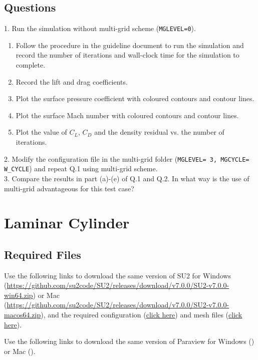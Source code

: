 \section{Questions}
1. Run the simulation without multi-grid scheme (\texttt{MGLEVEL=0}).
\begin{enumerate}[label=(\alph*)]
    \item Follow the procedure in the guideline document to run the simulation and record the number of iterations and wall-clock time for the simulation to complete.
    \item Record the lift and drag coefficients.
    \item Plot the surface pressure coefficient with coloured contours and contour lines.
    \item Plot the surface Mach number with coloured contours and contour lines.
    \item Plot the value of $C_L$, $C_D$ and the density residual vs. the number of iterations.
\end{enumerate}
2. Modify the configuration file in the multi-grid folder (\texttt{MGLEVEL= 3, MGCYCLE= W\_CYCLE}) and repeat Q.1 using multi-grid scheme.\\
3. Compare the results in part (a)-(e) of Q.1 and Q.2. In what way is the use of multi-grid advantageous for this test case?\\
\chapter{Laminar Cylinder}
\label{ch:Laminar Cylinder}
\section{Required Files}
\begin{su2note}
	Use the following links to download the same version of SU2 for Windows (\href{}{https://github.com/su2code/SU2/releases/download/v7.0.0/SU2-v7.0.0-win64.zip}) or Mac (\href{}{https://github.com/su2code/SU2/releases/download/v7.0.0/SU2-v7.0.0-macos64.zip}), and the required configuration (\href{}{click here}) and mesh files (\href{}{click here}).
\end{su2note}
\begin{paraviewnote}
	Use the following links to download the same version of Paraview for Windows (\href{}{}) or Mac (\href{}{}).
\end{paraviewnote}
